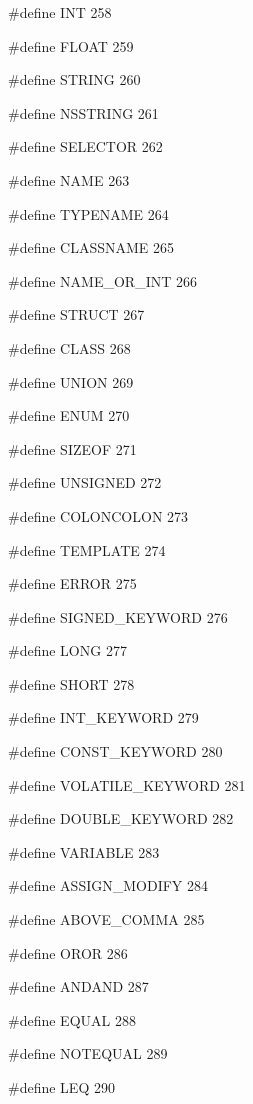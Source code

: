 \medskip
{\stt \#define INT 258}

\medskip
{\stt \#define FLOAT 259}

\medskip
{\stt \#define STRING 260}

\medskip
{\stt \#define NSSTRING 261}

\medskip
{\stt \#define SELECTOR 262}

\medskip
{\stt \#define NAME 263}

\medskip
{\stt \#define TYPENAME 264}

\medskip
{\stt \#define CLASSNAME 265}

\medskip
{\stt \#define NAME\_OR\_INT 266}

\medskip
{\stt \#define STRUCT 267}

\medskip
{\stt \#define CLASS 268}

\medskip
{\stt \#define UNION 269}

\medskip
{\stt \#define ENUM 270}

\medskip
{\stt \#define SIZEOF 271}

\medskip
{\stt \#define UNSIGNED 272}

\medskip
{\stt \#define COLONCOLON 273}

\medskip
{\stt \#define TEMPLATE 274}

\medskip
{\stt \#define ERROR 275}

\medskip
{\stt \#define SIGNED\_KEYWORD 276}

\medskip
{\stt \#define LONG 277}

\medskip
{\stt \#define SHORT 278}

\medskip
{\stt \#define INT\_KEYWORD 279}

\medskip
{\stt \#define CONST\_KEYWORD 280}

\medskip
{\stt \#define VOLATILE\_KEYWORD 281}

\medskip
{\stt \#define DOUBLE\_KEYWORD 282}

\medskip
{\stt \#define VARIABLE 283}

\medskip
{\stt \#define ASSIGN\_MODIFY 284}

\medskip
{\stt \#define ABOVE\_COMMA 285}

\medskip
{\stt \#define OROR 286}

\medskip
{\stt \#define ANDAND 287}

\medskip
{\stt \#define EQUAL 288}

\medskip
{\stt \#define NOTEQUAL 289}

\medskip
{\stt \#define LEQ 290}

